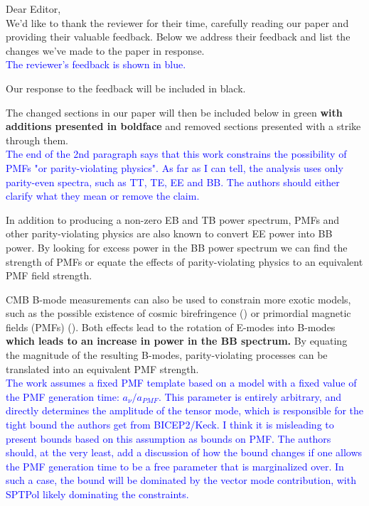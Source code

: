 \documentclass{article}
\begin{document}
Dear Editor,
\\

We'd like to thank the reviewer for their time, carefully reading our paper and providing their valuable feedback. Below we address their feedback and list the changes we've made to the paper in response.
\\

\textcolor{blue}{The reviewer's feedback is shown in blue.}

Our response to the feedback will be included in black. 

\textcolor{PineGreen}{The changed sections in our paper will then be included below in green \textbf{with additions presented in boldface} and removed sections presented with a strike through them.}
\\

\textcolor{blue}{The end of the 2nd paragraph says that this work constrains the possibility of PMFs "or parity-violating physics". As far as I can tell, the analysis uses only parity-even spectra, such as TT, TE, EE and BB. The authors should either clarify what they mean or remove the claim.}

In addition to producing a non-zero EB and TB power spectrum, PMFs and other parity-violating physics are also known to convert EE power into BB power. By looking for excess power in the BB power spectrum we can find the strength of PMFs or equate the effects of parity-violating physics to an equivalent PMF field strength.

\textcolor{PineGreen}{CMB B-mode measurements can also be used to constrain more exotic models, such as the possible existence of cosmic birefringence (\citep{carroll98,lue99}) or primordial magnetic fields (PMFs) (\citep{kosowsky96, seshadri01}).  
Both effects lead to the rotation of E-modes into B-modes \textbf{which leads to an increase in power in the BB spectrum.}
By equating the magnitude of the resulting B-modes, parity-violating processes can be translated into an equivalent PMF strength.  }
\\

\textcolor{blue}{The work assumes a fixed PMF template based on a model with a fixed value of the PMF generation time: $a_{\nu}/a_{PMF}$. This parameter is entirely arbitrary, and directly determines the amplitude of the tensor mode, which is responsible for the tight bound the authors get from BICEP2/Keck. I think it is misleading to present bounds based on this assumption as bounds on PMF. The authors should, at the very least, add a discussion of how the bound changes if one allows the PMF generation time to be a free parameter that is marginalized over. In such a case, the bound will be dominated by the vector mode contribution, with SPTPol likely dominating the constraints.}
\end{document}
